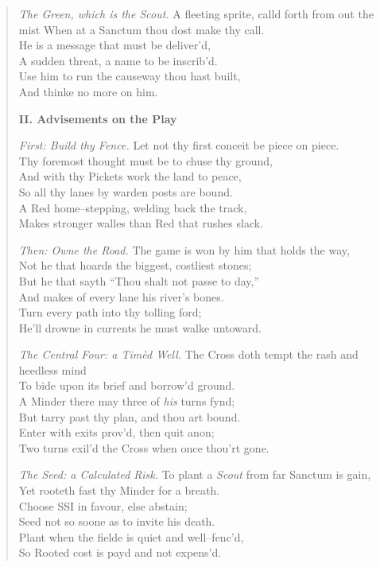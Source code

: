 \documentclass[11pt]{article}
\begin{document}
\begin{quote}
\textit{The Green, which is the Scout.}
A fleeting sprite, calld forth from out the mist
When at a Sanctum thou dost make thy call.\\
He is a message that must be deliver’d,\\
A sudden threat, a name to be inscrib’d.\\
Use him to run the causeway thou hast built,\\
And thinke no more on him.

\medskip
\textbf{II. Advisements on the Play}

\textit{First: Build thy Fence.}
Let not thy first conceit be piece on piece.\\
Thy foremost thought must be to chuse thy ground,\\
And with thy Pickets work the land to peace,\\
So all thy lanes by warden posts are bound.\\
A Red home--stepping, welding back the track,\\
Makes stronger walles than Red that rushes slack.

\textit{Then: Owne the Road.}
The game is won by him that holds the way,\\
Not he that hoards the biggest, costliest stones;\\
But he that sayth “Thou shalt not passe to day,”\\
And makes of every lane his river’s bones.\\
Turn every path into thy tolling ford;\\
He’ll drowne in currents he must walke untoward.

\textit{The Central Four: a Tim\`{e}d Well.}
The Cross doth tempt the rash and heedless mind\\
To bide upon its brief and borrow’d ground.\\
A Minder there may three of \emph{his} turns fynd;\\
But tarry past thy plan, and thou art bound.\\
Enter with exits prov’d, then quit anon;\\
Two turns exil’d the Cross when once thou’rt gone.

\textit{The Seed: a Calculated Risk.}
To plant a \emph{Scout} from far Sanctum is gain,\\
Yet rooteth fast thy Minder for a breath.\\
Choose SSI in favour, else abstain;\\
Seed not so soone as to invite his death.\\
Plant when the fielde is quiet and well--fenc’d,\\
So Rooted cost is payd and not expens’d.


\end{quote}
\end{document}
